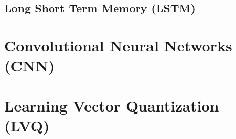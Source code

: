 \subsection{Long Short Term Memory (LSTM)}
\label{class:RNN:LSTM}

\section{Convolutional Neural Networks (CNN)}
\label{class:CNN}

\section{Learning Vector Quantization (LVQ)}
\label{class:kNN:LVQ}

